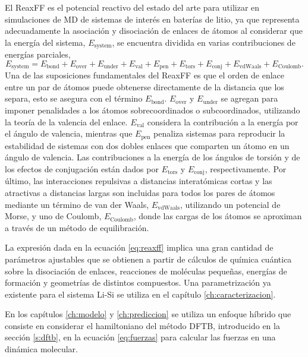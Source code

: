 El ReaxFF \cite{reaxff} es el potencial reactivo del estado del arte para 
utilizar en simulaciones de MD de sistemas de interés en baterías de litio, ya
que representa adecuadamente la asociación y disociación de enlaces de átomos al 
considerar que la energía del sistema, $E_{\text{system}}$, se encuentra dividida
en varias contribuciones de energías parciales,
\begin{equation}\label{eq:reaxff}
    E_{\text{system}} = E_{\text{bond}} + E_{\text{over}} + E_{\text{under}} + E_{\text{val}} + E_{\text{pen}} + E_{\text{tors}} + E_{\text{conj}} + E_{\text{vdWaals}} + E_{\text{Coulomb}}.
\end{equation}
Una de las suposiciones fundamentales del ReaxFF es que el orden de enlace entre
un par de átomos puede obtenerse directamente de la distancia que los separa, 
esto se asegura con el término $E_{\text{bond}}$. $E_{\text{over}}$ y 
$E_{\text{under}}$ se agregan para imponer penalidades a los átomos 
sobrecoordinados o subcoordinados, utilizando la teoría de la valencia del enlace.
$E_{\text{val}}$ considera la contribución a la energía por el ángulo de valencia, 
mientras que $E_{\text{pen}}$ penaliza sistemas para reproducir la estabilidad de 
sistemas con dos dobles enlaces que comparten un átomo en un ángulo de valencia.
Las contribuciones a la energía de los ángulos de torsión y de los efectos de 
conjugación están dados por $E_{\text{tors}}$ y $E_{\text{conj}}$, 
respectivamente. Por último, las interacciones repulsivas a distancias 
interatómicas cortas y las atractivas a distancias largas son incluidas para 
todos los pares de átomos mediante un término de van der Waals, 
$E_{\text{vdWaals}}$, utilizando un potencial de Morse, y uno de Coulomb, 
$E_{\text{Coulomb}}$, donde las cargas de los átomos se aproximan a través de 
un método de equilibración.

La expresión dada en la ecuación \ref{eq:reaxff} implica una gran cantidad de 
parámetros ajustables que se obtienen a partir de cálculos de química cuántica
sobre la disociación de enlaces, reacciones de moléculas pequeñas, energías de 
formación y geometrías de distintos compuestos. Una parametrización ya existente
para el sistema Li-Si \cite{fan2013} se utiliza en el capítulo 
\ref{ch:caracterizacion}.

En los capítulos \ref{ch:modelo} y \ref{ch:prediccion} se utiliza un enfoque 
híbrido que consiste en considerar el hamiltoniano del método DFTB, introducido 
en la sección \ref{s:dftb}, en la ecuación \ref{eq:fuerzas} para calcular las 
fuerzas en una dinámica molecular.


